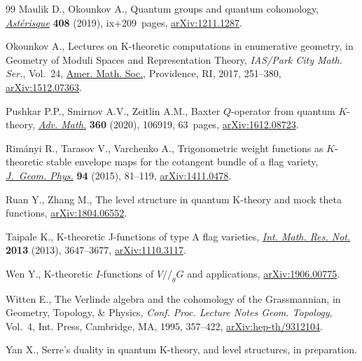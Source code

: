 \documentclass[10pt,a4paper]{amsart}
\numberwithin{equation}{section}
\theoremstyle{definition}
\theoremstyle{plain}
\begin{document}
\begin{thebibliography}{99}
Maulik D., Okounkov A., Quantum groups and quantum cohomology,
 \href{https://doi.org/10.24033/ast}{\textit{Ast\'erisque}} \textbf{408} (2019), ix+209~pages, \href{https://arxiv.org/abs/1211.1287}{arXiv:1211.1287}.

Okounkov A., Lectures on {K}-theoretic computations in enumerative geometry, in
 Geometry of Moduli Spaces and Representation Theory, \textit{IAS/Park City
 Math. Ser.}, Vol.~24, \href{https://doi.org/10.1090/pcms/024}{Amer. Math. Soc.}, Providence, RI, 2017, 251--380,
 \href{https://arxiv.org/abs/1512.07363}{arXiv:1512.07363}.

Pushkar P.P., Smirnov A.V., Zeitlin A.M., Baxter {$Q$}-operator from quantum
 {$K$}-theory, \href{https://doi.org/10.1016/j.aim.2019.106919}{\textit{Adv. Math.}} \textbf{360} (2020), 106919, 63~pages,
 \href{https://arxiv.org/abs/1612.08723}{arXiv:1612.08723}.

Rim\'anyi R., Tarasov V., Varchenko A., Trigonometric weight functions as
 {$K$}-theoretic stable envelope maps for the cotangent bundle of a flag
 variety, \href{https://doi.org/10.1016/j.geomphys.2015.04.002}{\textit{J.~Geom. Phys.}} \textbf{94} (2015), 81--119,
 \href{https://arxiv.org/abs/1411.0478}{arXiv:1411.0478}.

Ruan Y., Zhang M., The level structure in quantum {K}-theory and mock theta
 functions, \href{https://arxiv.org/abs/1804.06552}{arXiv:1804.06552}.

Taipale K., K-theoretic {J}-functions of type {A} flag varieties, \href{https://doi.org/10.1093/imrn/rns156}{\textit{Int.
 Math. Res. Not.}} \textbf{2013} (2013), 3647--3677, \href{https://arxiv.org/abs/1110.3117}{arXiv:1110.3117}.

Wen Y., {K}-theoretic {$I$}-functions of {$V//_{\theta}G$} and applications,
 \href{https://arxiv.org/abs/1906.00775}{arXiv:1906.00775}.

Witten E., The {V}erlinde algebra and the cohomology of the {G}rassmannian, in
 Geometry, Topology, \& Physics, \textit{Conf. Proc. Lecture Notes Geom.
 Topology}, Vol.~4, Int. Press, Cambridge, MA, 1995, 357--422,
 \href{https://arxiv.org/abs/hep-th/9312104}{arXiv:hep-th/9312104}.

Yan X., Serre's duality in quantum {K}-theory, and level structures, in
 preparation.

\end{thebibliography}
\end{document}
